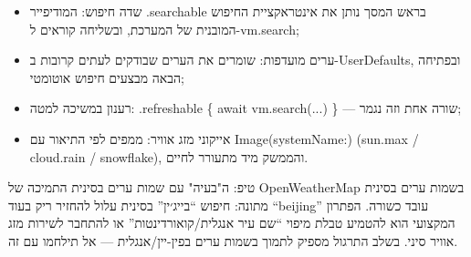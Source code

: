 
\begin{itemize}
  \item שדה חיפוש: המודיפייר .searchable בראש המסך נותן את אינטראקציית החיפוש המובנית של המערכת, ובשליחה קוראים ל-vm.search;
  \item ערים מועדפות: שומרים את הערים שבודקים לעתים קרובות ב-UserDefaults, ובפתיחה הבאה מבצעים חיפוש אוטומטי;
  \item רענון במשיכה למטה: .refreshable \{ await vm.search(...) \} — שורה אחת וזה נגמר;
  \item אייקוני מזג אוויר: ממפים לפי התיאור עם Image(systemName:) (sun.max / cloud.rain / snowflake), והממשק מיד מתעורר לחיים.
\end{itemize}

\begin{tcbinfo}{טיפ: ה"בעיה" עם שמות ערים בסינית}
התמיכה של OpenWeatherMap בשמות ערים בסינית מתונה: חיפוש “בייג׳ין” בסינית עלול להחזיר ריק בעוד “beijing” עובד כשורה. הפתרון המקצועי הוא להטמיע טבלת מיפוי “שם עיר אנגלית/קואורדינטות” או להתחבר לשירות מזג אוויר סיני. בשלב התרגול מספיק לתמוך בשמות ערים בפין-יין/אנגלית — אל תילחמו עם זה.

\end{tcbinfo}

